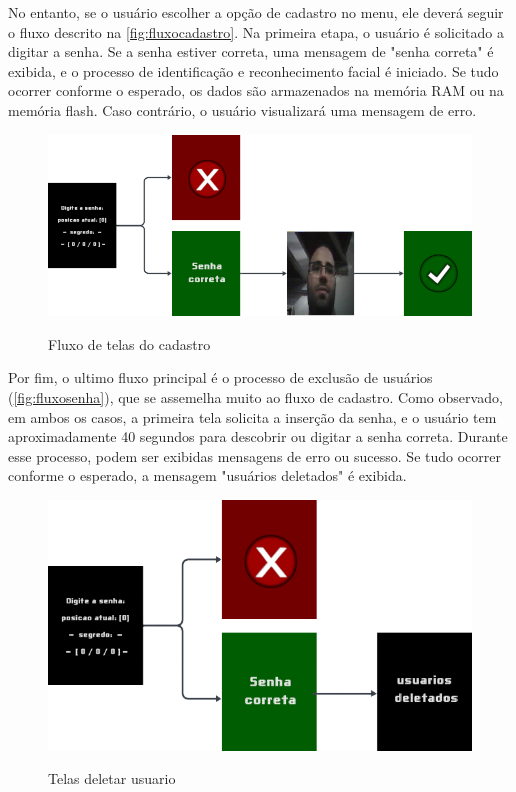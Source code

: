 No entanto, se o usuário escolher a opção de cadastro no menu, 
ele deverá seguir o fluxo descrito na \autoref{fig:fluxocadastro}. 
Na primeira etapa, o usuário é solicitado a digitar a senha. 
Se a senha estiver correta, uma mensagem de "senha correta" é 
exibida, e o processo de identificação e reconhecimento facial 
é iniciado. Se tudo ocorrer conforme o esperado, os dados são 
armazenados na memória RAM ou na memória flash. Caso contrário, 
o usuário visualizará uma mensagem de erro.

\begin{figure}[h!]
    \centering
    \caption{Fluxo de telas do cadastro}
    \includegraphics[scale=2.5]{figuras/fluxo_cadastro.png}
    \fonte{}%
    \label{fig:fluxocadastro}
    \centering
\end{figure}


Por fim, o ultimo fluxo principal é o processo de exclusão 
de usuários (\autoref{fig:fluxosenha}), que se assemelha 
muito ao fluxo de cadastro. Como observado, em ambos 
os casos, a primeira tela solicita a inserção 
da senha, e o usuário tem aproximadamente 40 segundos 
para descobrir ou digitar a senha correta. Durante esse processo, 
podem ser exibidas mensagens de erro ou sucesso. Se tudo ocorrer 
conforme o esperado, a mensagem "usuários deletados" é exibida.

\begin{figure}[h!]
    \centering
    \caption{Telas deletar usuario}
    \includegraphics[scale=2.5]{figuras/fluxo_deletar_usuario.png}
    \fonte{}%
    \label{fig:fluxosenha}
    \centering
\end{figure}

